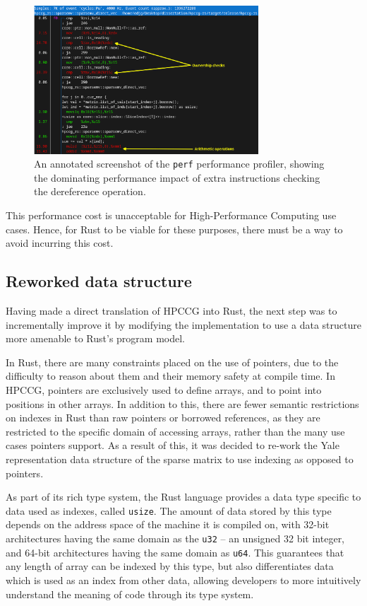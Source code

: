 \begin{figure}[H]
    \centering
    \includegraphics[width=0.75\textwidth]{images/3_translation/perf_annot_labelled.png}
    \caption{An annotated screenshot of the \texttt{perf} performance profiler, showing the dominating performance impact of extra instructions checking the dereference operation.}
    \label{fig:perf_annot_labelled}
\end{figure}

This performance cost is unacceptable for High-Performance Computing use cases. Hence, for Rust to be viable for these purposes, there must be a way to avoid incurring this cost.

\subsection{Reworked data structure}
\label{sec:translation-reworked-data-structure}

Having made a direct translation of HPCCG into Rust, the next step was to incrementally improve it by modifying the implementation to use a data structure more amenable to Rust's program model.

In Rust, there are many constraints placed on the use of pointers, due to the difficulty to reason about them and their memory safety at compile time. In HPCCG, pointers are exclusively used to define arrays, and to point into positions in other arrays. In addition to this, there are fewer semantic restrictions on indexes in Rust than raw pointers or borrowed references, as they are restricted to the specific domain of accessing arrays, rather than the many use cases pointers support. As a result of this, it was decided to re-work the Yale representation data structure of the sparse matrix to use indexing as opposed to pointers.

As part of its rich type system, the Rust language provides a data type specific to data used as indexes, called \texttt{usize}. The amount of data stored by this type depends on the address space of the machine it is compiled on, with 32-bit architectures having the same domain as the \texttt{u32} -- an unsigned 32 bit integer, and 64-bit architectures having the same domain as \texttt{u64}. This guarantees that any length of array can be indexed by this type, but also differentiates data which is used as an index from other data, allowing developers to more intuitively understand the meaning of code through its type system.

